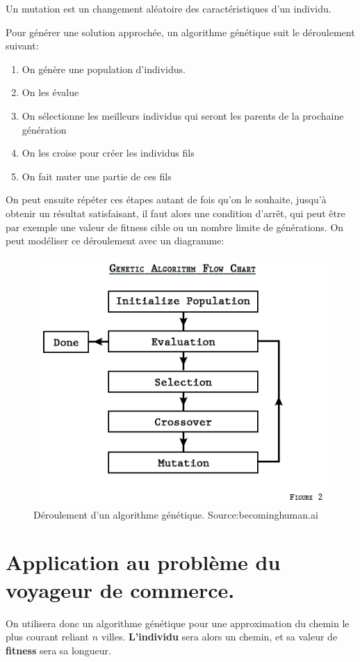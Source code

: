 \documentclass[12pt]{article}
\begin{document}
Un mutation est un changement aléatoire des caractéristiques d'un individu. 

Pour générer une solution approchée, un algorithme génétique suit le déroulement suivant:

\begin{enumerate}
\item On génère une population d'individus.
\item On les évalue
\item On sélectionne les meilleurs individus qui seront les parents de la prochaine génération
\item On les croise pour créer les individus fils
\item On fait muter une partie de ces fils
\end{enumerate}

On peut ensuite répéter ces étapes autant de fois qu'on le souhaite, jusqu'à obtenir un résultat satisfaisant,
il faut alors une condition d'arrêt, qui peut être par exemple une valeur de fitness cible ou un nombre limite de générations.
On peut modéliser ce déroulement avec un diagramme:

\begin{figure}[H]
\centering
\includegraphics[width=.6\linewidth]{./GA.png}
\caption{Déroulement d'un algorithme génétique. Source:becominghuman.ai}
\end{figure}

\section{Application au problème du voyageur de commerce.}
\label{sec-2}

On utilisera donc un algorithme génétique pour une approximation du chemin le plus courant reliant $n$ villes.
\textbf{L'individu} sera alors un chemin, et sa valeur de \textbf{fitness} sera sa longueur.   
\end{document}
